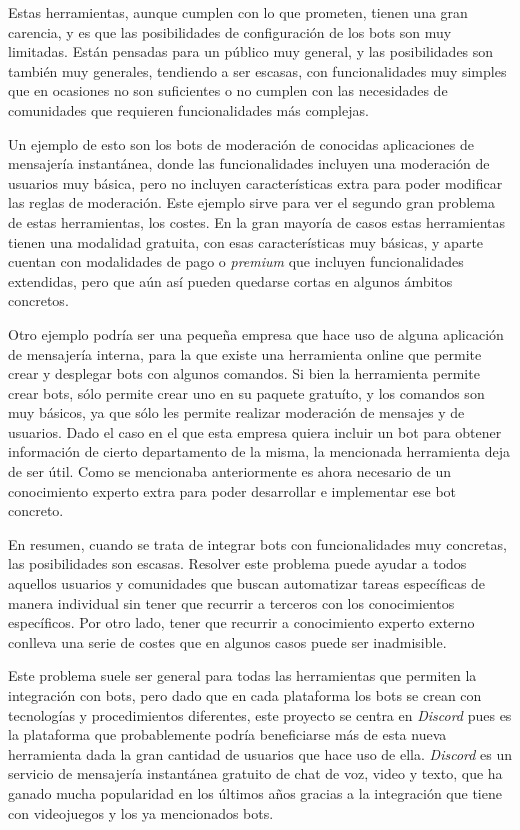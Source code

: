 Estas herramientas, aunque cumplen con lo que prometen, tienen una gran carencia, y es que las posibilidades de configuración de los bots son muy limitadas. Están pensadas para un público muy general, y las posibilidades son también muy generales, tendiendo a ser escasas, con funcionalidades muy simples que en ocasiones no son suficientes o no cumplen con las necesidades de comunidades que requieren funcionalidades más complejas.

Un ejemplo de esto son los bots de moderación de conocidas aplicaciones de mensajería instantánea, donde las funcionalidades incluyen una moderación de usuarios muy básica, pero no incluyen características extra para poder modificar las reglas de moderación. Este ejemplo sirve para ver el segundo gran problema de estas herramientas, los costes. En la gran mayoría de casos estas herramientas tienen una modalidad gratuita, con esas características muy básicas, y aparte cuentan con modalidades de pago o \textit{premium} que incluyen funcionalidades extendidas, pero que aún así pueden quedarse cortas en algunos ámbitos concretos.

Otro ejemplo podría ser una pequeña empresa que hace uso de alguna aplicación de mensajería interna, para la que existe una herramienta online que permite crear y desplegar bots con algunos comandos. Si bien la herramienta permite crear bots, sólo permite crear uno en su paquete gratuíto, y los comandos son muy básicos, ya que sólo les permite realizar moderación de mensajes y de usuarios. Dado el caso en el que esta empresa quiera incluir un bot para obtener información de cierto departamento de la misma, la mencionada herramienta deja de ser útil. Como se mencionaba anteriormente es ahora necesario de un conocimiento experto extra para poder desarrollar e implementar ese bot concreto.

En resumen, cuando se trata de integrar bots con funcionalidades muy concretas, las posibilidades son escasas. Resolver este problema puede ayudar a todos aquellos usuarios y comunidades que buscan automatizar tareas específicas de manera individual sin tener que recurrir a terceros con los conocimientos específicos. Por otro lado, tener que recurrir a conocimiento experto externo conlleva una serie de costes que en algunos casos puede ser inadmisible.

Este problema suele ser general para todas las herramientas que permiten la integración con bots, pero dado que en cada plataforma los bots se crean con tecnologías y procedimientos diferentes, este proyecto se centra en \textit{Discord}\cite{discord} pues es la plataforma que probablemente podría beneficiarse más de esta nueva herramienta dada la gran cantidad de usuarios que hace uso de ella. \textit{Discord} es un servicio de mensajería instantánea gratuito de chat de voz, video y texto, que ha ganado mucha popularidad en los últimos años gracias a la integración que tiene con videojuegos y los ya mencionados bots.

